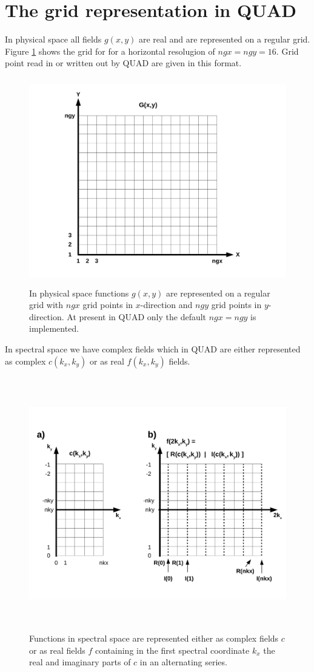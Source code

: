 \section{The grid representation in QUAD}
\label{ssec_Grids}
In physical space all fields $g(x,y)$ are real and are represented on a regular 
grid. Figure \ref{fig_physgrid} shows the grid for for a horizontal 
resolugion of $ngx = ngy = 16$. Grid point read in or written out by QUAD
are given in this format.
\begin{figure} \label{fig_physgrid}
   \includegraphics[height=9cm]{figures/phys_grid.pdf}
   \caption{In physical space functions $g(x,y)$ are represented on a
            regular grid with $ngx$ grid points in $x$-direction and 
            $ngy$ grid points in $y$-direction. At present in QUAD only
            the default $ngx = ngy$ is implemented.}
\end{figure}
In spectral space we have complex fields which in QUAD are either 
represented as complex $c(k_{x},k_{y})$ or as real $f(k_{x},k_{y})$ 
fields. 
\begin{figure} \label{fig_ctorspecgrid}
   \includegraphics[height=11cm]{figures/cmplx_real_spec_grid.pdf}
   \caption{Functions in spectral space are represented either as
            complex fields $c$ or as real fields $f$ containing 
            in the first spectral coordinate $k_{x}$ the real and 
            imaginary parts of $c$ in an alternating series.}
\end{figure}
